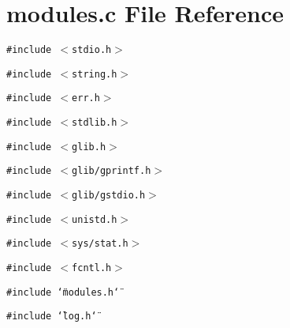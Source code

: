 \section{modules.c File Reference}
\label{modules_8c}
{\tt \#include $<$stdio.h$>$}\par
{\tt \#include $<$string.h$>$}\par
{\tt \#include $<$err.h$>$}\par
{\tt \#include $<$stdlib.h$>$}\par
{\tt \#include $<$glib.h$>$}\par
{\tt \#include $<$glib/gprintf.h$>$}\par
{\tt \#include $<$glib/gstdio.h$>$}\par
{\tt \#include $<$unistd.h$>$}\par
{\tt \#include $<$sys/stat.h$>$}\par
{\tt \#include $<$fcntl.h$>$}\par
{\tt \#include \char`\"{}modules.h\char`\"{}}\par
{\tt \#include \char`\"{}log.h\char`\"{}}\par

